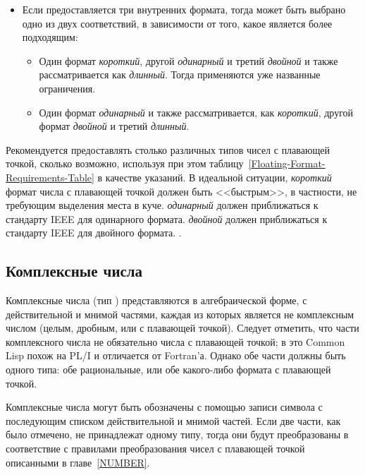 \begin{itemize}
\item 
Если предоставляется три внутренних формата, тогда может быть выбрано одно
из двух соответствий, в зависимости от того, какое является более подходящим:
\begin{itemize}
\item 
Один формат \emph{короткий}, другой \emph{одинарный} и третий \emph{двойной} и
также рассматривается как \emph{длинный}. Тогда применяются уже названные
ограничения.

\item 
Один формат \emph{одинарный} и также рассматривается, как \emph{короткий},
другой формат \emph{двойной} и третий \emph{длинный}.
\end{itemize}

\end{itemize}

\beforenoterule
\begin{implementation}
Рекомендуется предоставлять столько различных типов чисел с плавающей точкой,
сколько возможно, используя при этом
таблицу~\ref{Floating-Format-Requirements-Table} в качестве указаний.
В идеальной ситуации, \emph{короткий} формат числа с плавающей точкой должен
быть <<быстрым>>, в частности, не требующим выделения места в куче.
\emph{одинарный} должен приближаться к стандарту IEEE для одинарного формата.
\emph{двойной} должен приближаться к стандарту IEEE для двойного формата.
\cite{IEEE-PROPOSED-FLOATING-POINT-STANDARD,IEEE-FLOATING-POINT-IMPL-GUIDE,IEEE-FLOATING-POINT-IMPL-GUIDE-ERRATA}.
\end{implementation}
\afternoterule

\subsection{Комплексные числа}

Комплексные числа (тип )
представляются в алгебраической форме, с действительной и мнимой частями, каждая
из которых является не комплексным числом (целым, дробным, или с плавающей
точкой). Следует отметить, что части комплексного числа не
обязательно числа с плавающей точкой; в это Common Lisp похож на PL/I и
отличается от Fortran'а. Однако обе части должны быть одного типа: обе
рациональные, или обе какого-либо формата с плавающей точкой.

Комплексные числа могут быть обозначены с помощью записи символа  с
последующим списком действительной и мнимой частей.
Если две части, как было отмечено, не принадлежат одному типу, тогда они будут
преобразованы в соответствие с правилами преобразования чисел с плавающей точкой
описанными в главе~\ref{NUMBER}.

